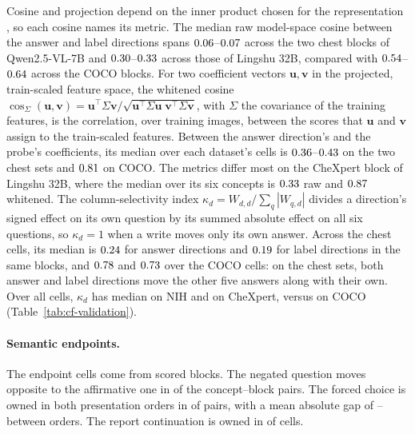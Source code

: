 \documentclass{article}
\begin{document}
Cosine and projection depend on the inner product chosen for the representation \citep{park2024linear}, so each cosine names its metric. The median raw model-space cosine between the answer and label directions spans $0.06$--$0.07$ across the two chest blocks of Qwen2.5-VL-7B and $0.30$--$0.33$ across those of Lingshu 32B, compared with $0.54$--$0.64$ across the COCO blocks. For two coefficient vectors $\boldsymbol u,\boldsymbol v$ in the projected, train-scaled feature space, the whitened cosine $\cos_\Sigma(\boldsymbol u,\boldsymbol v)=\boldsymbol u^{\top}\Sigma\boldsymbol v/\sqrt{\boldsymbol u^{\top}\Sigma\boldsymbol u\;\boldsymbol v^{\top}\Sigma\boldsymbol v}$, with $\Sigma$ the covariance of the training features, is the correlation, over training images, between the scores that $\boldsymbol u$ and $\boldsymbol v$ assign to the train-scaled features. Between the answer direction's and the probe's coefficients, its median over each dataset's cells is $0.36$--$0.43$ on the two chest sets and $0.81$ on COCO. The metrics differ most on the CheXpert block of Lingshu 32B, where the median over its six concepts is $0.33$ raw and $0.87$ whitened. The column-selectivity index $\kappa_d=W_{d,d}/\sum_q|W_{q,d}|$ divides a direction's signed effect on its own question by its summed absolute effect on all six questions, so $\kappa_d=1$ when a write moves only its own answer. Across the \cfAnsColSelChestN{} chest cells, its median is $0.24$ for answer directions and $0.19$ for label directions in the same blocks, and $0.78$ and $0.73$ over the \cfAnsColSelCocoN{} COCO cells: on the chest sets, both answer and label directions move the other five answers along with their own. Over all cells, $\kappa_d$ has median \cfValColSelNih{} on NIH and \cfValColSelChex{} on CheXpert, versus \cfValColSelCoco{} on COCO (Table~\ref{tab:cf-validation}).

\paragraph{Semantic endpoints.} The endpoint cells come from \cfSemBlocks{} scored blocks. The negated question moves opposite to the affirmative one in \cfSemNegOpposite{} of the \cfSemNegN{} concept--block pairs. The forced choice is owned in both presentation orders in \cfSemForcedOwned{} of \cfSemForcedN{} pairs, with a mean absolute gap of \cfSemGapMin{}--\cfSemGapMax{} between orders. The report continuation is owned in \cfSemReportOwned{} of \cfSemReportCells{} cells.
\end{document}
